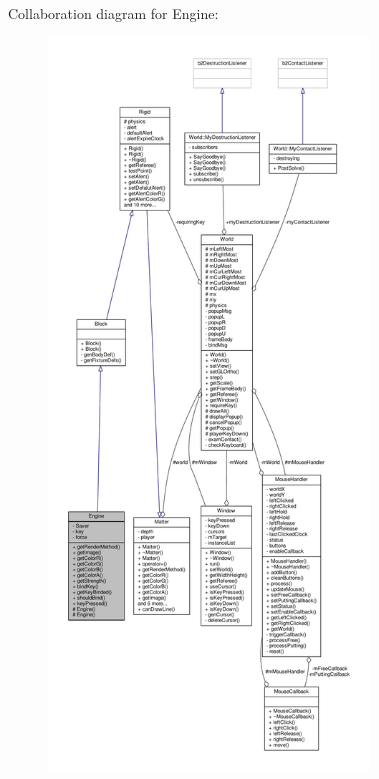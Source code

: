 Collaboration diagram for Engine\+:
\nopagebreak
\begin{figure}[H]
\begin{center}
\leavevmode
\includegraphics[height=550pt]{classEngine__coll__graph}
\end{center}
\end{figure}
